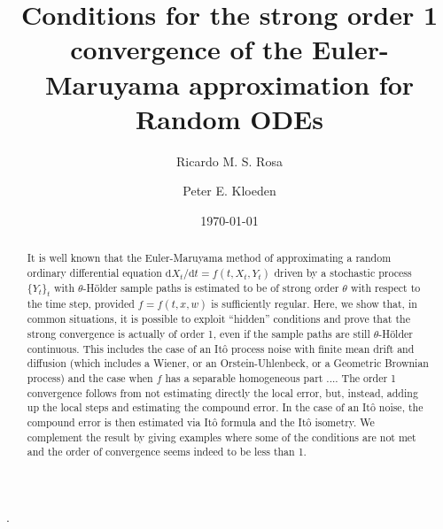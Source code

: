 \documentclass[reqno,12pt]{amsart}
\theoremstyle{plain}%
\theoremstyle{definition}
\begin{document}


\title[Strong order 1 convergence of Euler-Maruyama for Random ODEs]{Conditions for the strong order 1 convergence of the Euler-Maruyama approximation for Random ODEs}

\author[R. M. S. Rosa]{Ricardo M. S. Rosa}

\author[P. E. Kloeden]{Peter E. Kloeden}

\address[Ricardo M. S. Rosa]{Instituto de Matem\'atica, Universidade Federal do Rio de Janeiro, Brazil}
\address[Peter E. Kloeden]{Mathematics Department, University of Tubingen, Germany}


\date{\today}


.

\begin{abstract}
It is well known that the Euler-Maruyama method of approximating a random ordinary differential equation $\mathrm{d}X_t/\mathrm{d}t = f(t, X_t, Y_t)$ driven by a stochastic process $\{Y_t\}_t$ with $\theta$-H\"older sample paths is estimated to be of strong order $\theta$ with respect to the time step, provided $f=f(t, x, w)$ is sufficiently regular. Here, we show that, in common situations, it is possible to exploit ``hidden'' conditions and prove that the strong convergence is actually of order 1, even if the sample paths are still $\theta$-H\"older continuous. This includes the case of an It\^o process noise with finite mean drift and diffusion (which includes a Wiener, or an Orstein-Uhlenbeck, or a Geometric Brownian process) and the case when $f$ has a separable homogeneous part .... The order 1 convergence follows from not estimating directly the local error, but, instead, adding up the local steps and estimating the compound error. In the case of an It\^o noise, the compound error is then estimated via It\^o formula and the It\^o isometry. We complement the result by giving examples where some of the conditions are not met and the order of convergence seems indeed to be less than 1.
\end{abstract}
\end{document}
